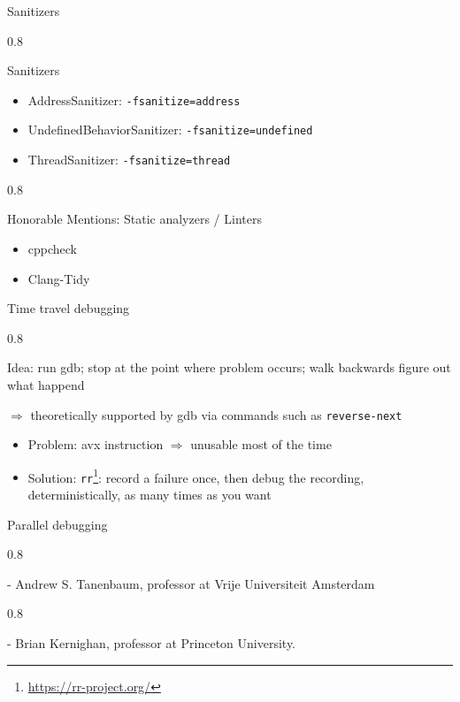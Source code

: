 \documentclass[aspectratio=1610]{beamer}
\newenvironment{centeredblock}[2][0.8\textwidth]
{ %
	\begin{center}
		\begin{varwidth}{#1} %
			\begin{block}{#2}
				\centering
			}
			{ %
			\end{block}
		\end{varwidth}
	\end{center}
}
\begin{document}
	\begin{frame}[fragile]{Sanitizers}
		\begin{centeredblock}{Sanitizers}
			\begin{itemize}
				\item AddressSanitizer: \texttt{-fsanitize=address}
				\item UndefinedBehaviorSanitizer: \texttt{-fsanitize=undefined}
				\item ThreadSanitizer: \texttt{-fsanitize=thread}
			\end{itemize}
		\end{centeredblock}
	
		{\def\thefootnote{}}
	
		\begin{centeredblock}{Honorable Mentions: Static analyzers / Linters}
			\begin{itemize}
				\item cppcheck
				\item Clang-Tidy
			\end{itemize}
		\end{centeredblock}
	\end{frame}
	
	\begin{frame}[fragile]{Time travel debugging}
		\begin{centeredblock}{}
			Idea: run gdb; stop at the point where problem occurs; walk backwards figure out what happend
			
			$\Rightarrow$ theoretically supported by gdb via commands such as \texttt{reverse-next}
			\begin{itemize}
				\item Problem: avx instruction $\Rightarrow$ unusable most of the time
				\item Solution: \texttt{rr}\footnote{\href{rr}{https://rr-project.org/}}: record a failure once, then debug the recording, deterministically, as many times as you want
			\end{itemize}
		\end{centeredblock}
	
		
	\end{frame}
	
	\begin{frame}[fragile]{Parallel debugging}
		\begin{centeredblock}{}
			 - Andrew S. Tanenbaum, professor at Vrije Universiteit Amsterdam
		\end{centeredblock}
		
		\begin{centeredblock}{}
			 - Brian Kernighan, professor at Princeton University.
		\end{centeredblock}
	\end{frame}
	
\end{document}
